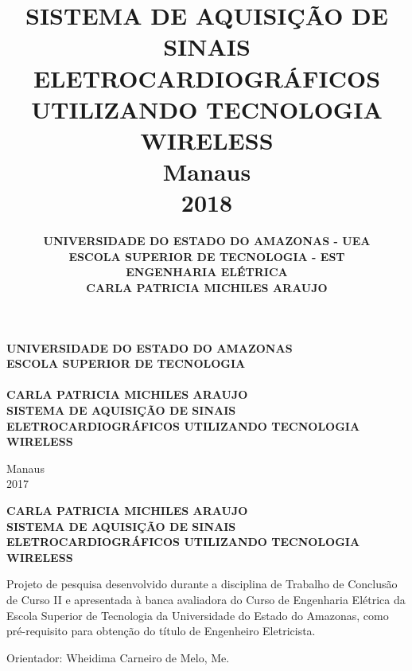 \documentclass[12pt, a4paper]{article}
\author{ \bf UNIVERSIDADE DO ESTADO DO AMAZONAS - UEA \\[14pt] \small ESCOLA SUPERIOR DE TECNOLOGIA - EST \\[14pt] ENGENHARIA ELÉTRICA \\[96pt] CARLA PATRICIA MICHILES ARAUJO \\[96pt]}
\title{ \rm \bf \Large SISTEMA DE AQUISIÇÃO DE SINAIS ELETROCARDIOGRÁFICOS UTILIZANDO TECNOLOGIA WIRELESS\\[123pt] \rm \small Manaus \\  2018}
\newcommand{\bigsize}{\fontsize{12pt}{20pt}\selectfont}
\begin{document}
\thispagestyle{empty}
\begin{center}
\textbf{ UNIVERSIDADE DO ESTADO DO AMAZONAS \\
ESCOLA SUPERIOR DE TECNOLOGIA \\[50pt] }
\textbf{ \\[70pt] {\bigsize CARLA PATRICIA MICHILES ARAUJO} \\[120pt] }
\textbf{ {\bigsize SISTEMA DE AQUISIÇÃO DE SINAIS ELETROCARDIOGRÁFICOS UTILIZANDO TECNOLOGIA WIRELESS}  \\[104pt] }
\end{center}
\hspace*{8cm}

\vspace*{\fill}

\begin{center}
Manaus \\ 2017
\end{center}


\newpage
\thispagestyle{empty}
\begin{center}


\textbf{ {\bigsize CARLA PATRICIA MICHILES ARAUJO} \\[120pt] }
\textbf{ {\bigsize SISTEMA DE AQUISIÇÃO DE SINAIS ELETROCARDIOGRÁFICOS UTILIZANDO TECNOLOGIA WIRELESS}  \\[50pt] }
\end{center}
\hspace*{8cm}
\begin{flushright}
\begin{minipage}{8cm}
\begin{singlespace}
Projeto de pesquisa desenvolvido durante a disciplina de Trabalho de Conclusão de Curso II e apresentada à banca avaliadora do Curso de Engenharia Elétrica da Escola Superior de Tecnologia da Universidade do Estado do Amazonas, como pré-requisito para obtenção do título de Engenheiro Eletricista.\\[50pt]
\end{singlespace}
\end{minipage}
\end{flushright}
\begin{center}
Orientador: Wheidima Carneiro de Melo, Me.

\end{center}
\end{document}
